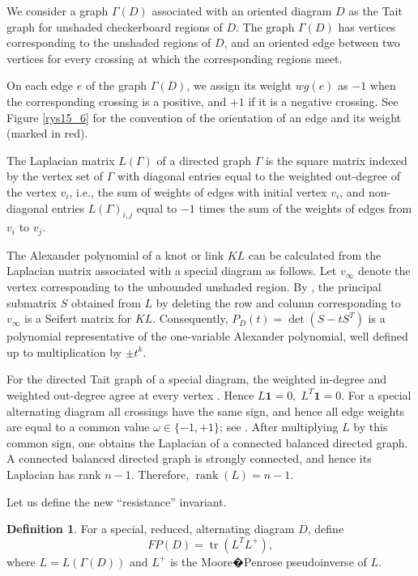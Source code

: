 \documentclass[a4paper,12pt]{amsart}
\numberwithin{equation}{section}
\theoremstyle{plain}
\theoremstyle{definition}
\newtheorem{definition}[theorem]{Definition}
\begin{document}
We consider a graph $\Gamma(D)$ associated with an oriented diagram $D$ as the Tait graph for unshaded checkerboard regions of $D$. The graph $\Gamma(D)$ has vertices corresponding to the unshaded regions of $D$, and an oriented edge between two vertices for every crossing at which the corresponding regions meet.
\par
On each edge $e$ of the graph $\Gamma(D)$, we assign its weight $wg(e)$ as $-1$ when the corresponding crossing is a positive, and $+1$ if it is a negative crossing. See Figure \ref{rys15_6} for the convention of the orientation of an edge and its weight (marked in red).




\par
The Laplacian matrix $L(\Gamma)$ of a directed graph $\Gamma$ is the square matrix indexed by the vertex set of $\Gamma$ with diagonal entries equal to the weighted out-degree of the vertex $v_i$, i.e., the sum of weights of edges with initial vertex $v_i$, and non-diagonal entries $L(\Gamma)_{i,j}$ equal to $-1$ times the sum of the weights of edges from $v_i$ to $v_j$.
\par
The Alexander polynomial of a knot or link $KL$ can be calculated
from the Laplacian matrix associated with a special diagram as
follows. Let $v_{\infty}$ denote the vertex corresponding to the
unbounded unshaded region. By \cite{SilWil19}, the principal
submatrix $S$ obtained from $L$ by deleting the row and column
corresponding to $v_{\infty}$ is a Seifert matrix for $KL$.
Consequently,
$
P_D(t)=\det(S-tS^T)
$
is a polynomial representative of the one-variable Alexander
polynomial, well defined up to multiplication by $\pm t^k$.

For the directed Tait graph of a special diagram, the weighted
in-degree and weighted out-degree agree at every vertex
\cite{SilWil19}. Hence
$
L\mathbf{1}=0,
\;
L^T\mathbf{1}=0.
$
For a special alternating diagram all crossings have the same sign,
and hence all edge weights are equal to a common value
$\omega\in\{-1,+1\}$; see \cite{Sto05}.
After multiplying $L$ by this common sign, one obtains the
Laplacian of a connected balanced directed graph. A connected balanced
directed graph is strongly connected, and hence its Laplacian has
rank $n-1$. Therefore, 
$
\operatorname{rank}(L)=n-1.
$



Let us define the new ``resistance'' invariant.

\begin{definition}
	For a special, reduced, alternating diagram $D$, define 
	$$FP(D)=\operatorname{tr}(L^TL^+),$$ where $L=L(\Gamma(D))$ and $L^+$ is the Moore�Penrose pseudoinverse of $L$. 
\end{definition}
\end{document}
